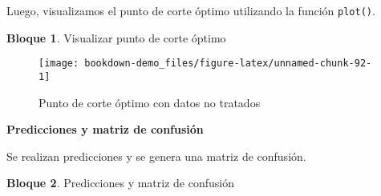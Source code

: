 \documentclass[
]{book}
\newenvironment{Shaded}{\begin{snugshade}}{\end{snugshade}}
\newcommand{\AttributeTok}[1]{\textcolor[rgb]{0.77,0.63,0.00}{#1}}
\newcommand{\ConstantTok}[1]{\textcolor[rgb]{0.00,0.00,0.00}{#1}}
\newcommand{\DecValTok}[1]{\textcolor[rgb]{0.00,0.00,0.81}{#1}}
\newcommand{\FloatTok}[1]{\textcolor[rgb]{0.00,0.00,0.81}{#1}}
\newcommand{\FunctionTok}[1]{\textcolor[rgb]{0.00,0.00,0.00}{#1}}
\newcommand{\NormalTok}[1]{#1}
\newcommand{\OtherTok}[1]{\textcolor[rgb]{0.56,0.35,0.01}{#1}}
\newcommand{\SpecialCharTok}[1]{\textcolor[rgb]{0.00,0.00,0.00}{#1}}
\newcommand{\StringTok}[1]{\textcolor[rgb]{0.31,0.60,0.02}{#1}}
\theoremstyle{definition}
\theoremstyle{definition}
\newtheorem{example}{Bloque}[chapter]
\theoremstyle{definition}
\theoremstyle{definition}
\theoremstyle{remark}
\begin{document}
\begin{Shaded}
\end{Shaded}

Luego, visualizamos el punto de corte óptimo utilizando la función \texttt{plot()}.

\begin{example}
\protect\hypertarget{exm:bloque19nbm}{}\label{exm:bloque19nbm}Visualizar punto de corte óptimo
\end{example}

\begin{Shaded}
\end{Shaded}

\begin{figure}
\texttt{[image: bookdown-demo\_files/figure-latex/unnamed-chunk-92-1]} \caption{Punto de corte óptimo con datos no tratados}\label{fig:unnamed-chunk-92}
\end{figure}

\textbf{Predicciones y matriz de confusión}

Se realizan predicciones y se genera una matriz de confusión.

\begin{example}
\protect\hypertarget{exm:bloque20nbm}{}\label{exm:bloque20nbm}Predicciones y matriz de confusión
\end{example}
\end{document}
